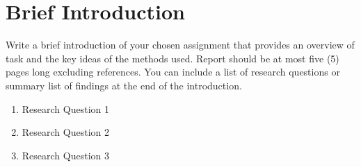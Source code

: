 \section{Brief Introduction}
Write a brief introduction of your chosen assignment that provides an overview of task and the key ideas of the methods used.
Report should be at most five (5) pages long excluding references.
You can include a list of research questions or summary list of findings at the end of the introduction.

\begin{enumerate}
    \item Research Question 1
    \item Research Question 2
    \item Research Question 3
\end{enumerate}

